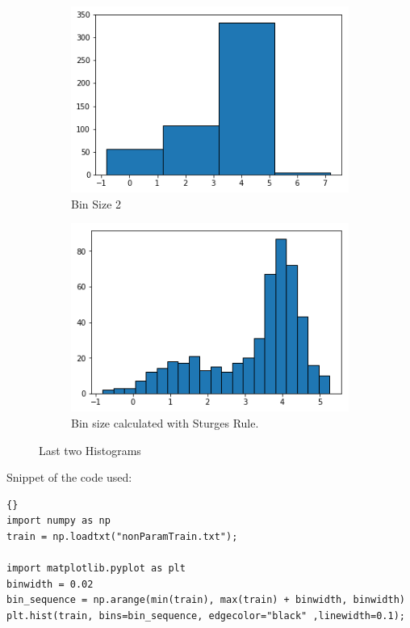 \begin{questions}
\begin{figure}[H]
	\centering
	\begin{subfigure}[b]{0.4\linewidth}
		\includegraphics[width=\linewidth]{pictures/histogram2.png}
		\caption{Bin Size 2}
		\label{fig:histogram3}
	\end{subfigure}
	\begin{subfigure}[b]{0.4\linewidth}
		\includegraphics[width=\linewidth]{pictures/histogramSturge.png}
		\caption{Bin size calculated with Sturges Rule.}
		\label{fig:histogram4}
	\end{subfigure}
	\caption{Last two Histograms}	
\end{figure}

	
Snippet of the code used: 
\begin{lstlisting}{}
import numpy as np
train = np.loadtxt("nonParamTrain.txt");

import matplotlib.pyplot as plt
binwidth = 0.02
bin_sequence = np.arange(min(train), max(train) + binwidth, binwidth)  
plt.hist(train, bins=bin_sequence, edgecolor="black" ,linewidth=0.1);
\end{lstlisting}


\end{questions}
